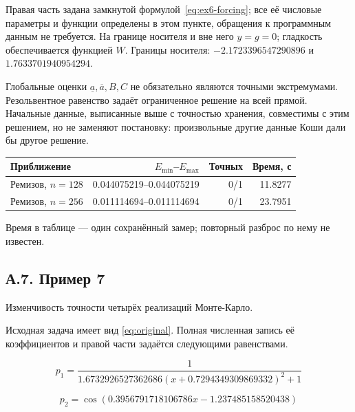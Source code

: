 Правая часть задана замкнутой формулой~\eqref{eq:ex6-forcing}; все её числовые параметры и функции определены в этом пункте, обращения к программным данным не требуется. На границе носителя и вне него $y=g=0$; гладкость обеспечивается функцией $W$. Границы носителя: $-2.1723396547290896$ и $1.7633701940954294$.

Глобальные оценки $\underline a,\overline a,B,C$ не обязательно являются точными экстремумами. Резольвентное равенство задаёт ограниченное решение на всей прямой. Начальные данные, выписанные выше с точностью хранения, совместимы с этим решением, но не заменяют постановку: произвольные другие данные Коши дали бы другое решение.

\begin{center}\label{tab:ex6}\begin{tabular}{lrrr}\toprule Приближение&$E_{\min}$--$E_{\max}$&Точных&Время, с\\\midrule

Ремизов, $n=128$&0.044075219--0.044075219&0/1&11.8277\\

Ремизов, $n=256$&0.011114694--0.011114694&0/1&23.7951\\

\bottomrule\end{tabular}\end{center}

Время в таблице --- один сохранённый замер; повторный разброс по нему не известен.

\clearpage

\subsection*{А.7. Пример 7}\label{app:ex7}

Изменчивость точности четырёх реализаций Монте-Карло.

Исходная задача имеет вид \eqref{eq:original}. Полная численная запись её коэффициентов и правой части задаётся следующими равенствами.

\begin{equation}
p_{1}=\frac{1}{1.6732926527362686 \left(x + 0.7294349309869332\right)^{2} + 1}
\end{equation}


\begin{equation}
p_{2}=\cos{\left(0.3956791718106786 x - 1.237485158520438 \right)}
\end{equation}


